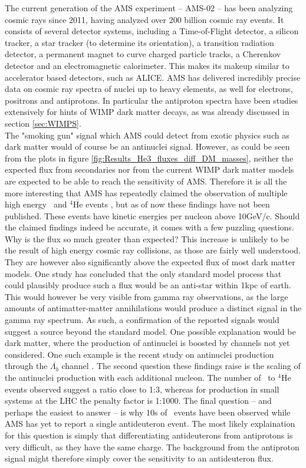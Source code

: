The current generation of the AMS experiment -- AMS-02 -- has been analyzing cosmic rays since 2011, having analyzed over 200 billion cosmic ray events. It consists of several detector systems, including a Time-of-Flight detector, a silicon tracker, a star tracker (to determine its orientation), a transition radiation detector, a permanent magnet to curve charged particle tracks, a Cherenkov detector and an electromagnetic calorimeter. This makes its makeup similar to accelerator based detectors, such as ALICE. AMS has delivered incredibly precise data on cosmic ray spectra of nuclei up to heavy elements, as well for electrons, positrons and antiprotons. In particular the antiproton spectra have been studies extensively for hints of WIMP dark matter decays, as was already discussed in section \ref{sec:WIMPS}. \\
The "smoking gun" signal which AMS could detect from exotic physics such as dark matter would of course be an antinuclei signal. However, as could be seen from the plots in figure \ref{fig:Results_He3_fluxes_diff_DM_masses}, neither the expected flux from secondaries nor from the current WIMP dark matter models are expected to be able to reach the sensitivity of AMS. Therefore it is all the more interesting that AMS has repeatedly claimed the observation of multiple high energy \ahe\ and $^4\mathrm{\overline{He}}$ events \cite{}, but as of now these findings have not been published. These events have kinetic energies per nucleon above 10GeV/c. Should the claimed findings indeed be accurate, it comes with a few puzzling questions. Why is the flux so much greater than expected? This increase is unlikely to be the result of high energy cosmic ray collisions, as those are fairly well understood. They are however also significantly above the expected flux of most dark matter models. One study has concluded that the only standard model process that could plausibly produce such a flux would be an anti-star within 1kpc of earth\cite{}. This would however be very visible from gamma ray observations, as the large amounts of antimatter-matter annihilations would produce a distinct signal in the gamma ray spectrum\cite{}. As such, a confirmation of the reported signals would suggest a source beyond the standard model. One possible explanation would be dark matter, where the production of antinuclei is boosted by channels not yet considered. One such example is the recent study on antinuclei production through the $\overline{\Lambda_b}$ channel \cite{}. The second question these findings raise is the scaling of the antinuclei production with each additional nucleon. The number of \ahe\ to $^4\mathrm{\overline{He}}$ events observed suggest a ratio close to 1:3, whereas for production in small systems at the LHC the penalty factor is 1:1000. The final question -- and perhaps the easiest to answer -- is why 10s of \ahe\ events have been observed while AMS has yet to report a single antideuteron event. The most likely explaination for this question is simply that differentiating antideuterons from antiprotons is very difficult, as they have the same charge. The background from the antiproton signal might therefore simply cover the sensitivity to an antideuteron flux.\\

